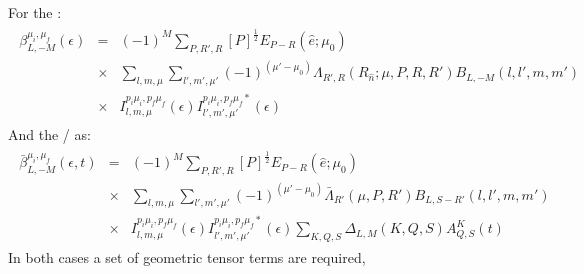 \documentclass[letterpaper,table,10pt,english]{jupyterBook}
\begin{document}
\sphinxAtStartPar
For the {\hyperref[\detokenize{backmatter/glossary:term-MF}]{}}:
\begin{equation}\label{equation:part1/theory_tensor_formalism_160723:eq:BLM-tensor-MF}
\begin{split}\begin{aligned}
\beta_{L,-M}^{\mu_{i},\mu_{f}}(\epsilon) & = & (-1)^{M}\sum_{P,R',R}{[P]^{\frac{1}{2}}}{E_{P-R}(\hat{e};\mu_{0})}\\
 & \times &\sum_{l,m,\mu}\sum_{l',m',\mu'}(-1)^{(\mu'-\mu_{0})}{\Lambda_{R',R}(R_{\hat{n}};\mu,P,R,R')B_{L,-M}(l,l',m,m')}\\
 & \times & I_{l,m,\mu}^{p_{i}\mu_{i},p_{f}\mu_{f}}(\epsilon)I_{l',m',\mu'}^{p_{i}\mu_{i},p_{f}\mu_{f}*}(\epsilon)\end{aligned}\end{split}
\end{equation}
\sphinxAtStartPar
And the {\hyperref[\detokenize{backmatter/glossary:term-LF}]{}}/{\hyperref[\detokenize{backmatter/glossary:term-AF}]{}} as:
\begin{equation}\label{equation:part1/theory_tensor_formalism_160723:eq:BLM-tensor-AF}
\begin{split}\begin{aligned}
\bar{\beta}_{L,-M}^{\mu_{i},\mu_{f}}(\epsilon,t) & = & (-1)^{M}\sum_{P,R',R}{[P]^{\frac{1}{2}}}{E_{P-R}(\hat{e};\mu_{0})}\\
 & \times &\sum_{l,m,\mu}\sum_{l',m',\mu'}(-1)^{(\mu'-\mu_{0})}{\bar{\Lambda}_{R'}(\mu,P,R')B_{L,S-R'}(l,l',m,m')}\\
 & \times &I_{l,m,\mu}^{p_{i}\mu_{i},p_{f}\mu_{f}}(\epsilon)I_{l',m',\mu'}^{p_{i}\mu_{i},p_{f}\mu_{f}*}(\epsilon)\sum_{K,Q,S}\Delta_{L,M}(K,Q,S)A_{Q,S}^{K}(t)\end{aligned}\end{split}
\end{equation}
\sphinxAtStartPar
In both cases a set of geometric tensor terms are required,
\end{document}
